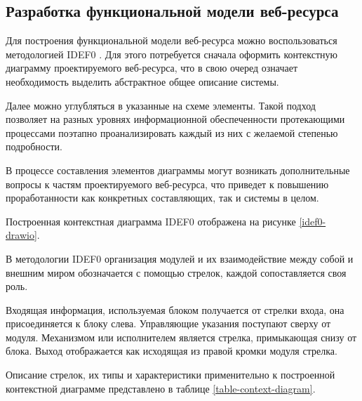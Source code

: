 \subsection{Разработка функциональной модели веб-ресурса}

Для построения функциональной модели веб-ресурса можно воспользоваться методологией IDEF0 \cite{wiki-idef0}.
Для этого потребуется сначала оформить контекстную диаграмму проектируемого веб-ресурса, что в свою очеред означает необходимость выделить абстрактное общее описание системы.

Далее можно углубляться в указанные на схеме элементы.
Такой подход позволяет на разных уровнях информационной обеспеченности протекающими процессами поэтапно проанализировать каждый из них с желаемой степенью подробности.

В процессе составления элементов диаграммы могут возникать дополнительные вопросы к частям проектируемого веб-ресурса, что приведет к повышению проработанности как конкретных составляющих, так и системы в целом.

Построенная контекстная диаграмма IDEF0 отображена на рисунке \ref{idef0-drawio}.

В методологии IDEF0 организация модулей и их взаимодействие между собой и внешним миром обозначается с помощью стрелок, каждой сопоставляется своя роль.

Входящая информация, используемая блоком получается от стрелки входа, она присоединяется к блоку слева.
Управляющие указания поступают сверху от модуля.
Механизмом или исполнителем является стрелка, примыкающая снизу от блока.
Выход отображается как исходящая из правой кромки модуля стрелка.

Описание стрелок, их типы и характеристики применительно к построенной контекстной диаграмме представлено в таблице \ref{table-context-diagram}.

